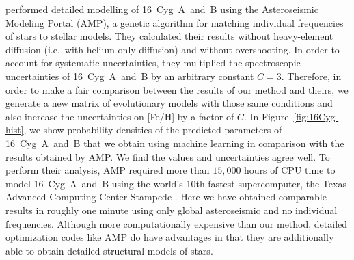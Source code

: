 \citet{2015ApJ...811L..37M} performed detailed modelling of 16~Cyg~A~and~B using the Asteroseismic Modeling Portal (AMP), a genetic algorithm for matching individual frequencies of stars to stellar models. They calculated their results without heavy-element diffusion (i.e.\ with helium-only diffusion) and without overshooting. In order to account for systematic uncertainties, they multiplied the spectroscopic uncertainties of 16~Cyg~A~and~B by an arbitrary constant ${C=3}$. Therefore, in order to make a fair comparison between the results of our method and theirs, we generate a new matrix of evolutionary models with those same conditions and also increase the uncertainties on [Fe/H] by a factor of $C$. In Figure~\ref{fig:16Cyg-hist}, we show probability densities of the predicted parameters of 16~Cyg~A~and~B that we obtain using machine learning in comparison with the results obtained by AMP. We find the values and uncertainties agree well. To perform their analysis, AMP required more than $15,000$ hours of CPU time to model 16~Cyg~A~and~B using the world's 10th fastest supercomputer, the Texas Advanced Computing Center Stampede \citep{TOP500}. Here we have obtained comparable results in roughly one minute  using only global asteroseismic  and no individual frequencies. Although more computationally expensive than our method, detailed optimization codes like AMP do have advantages in that they are additionally able to obtain detailed structural models of stars. %

